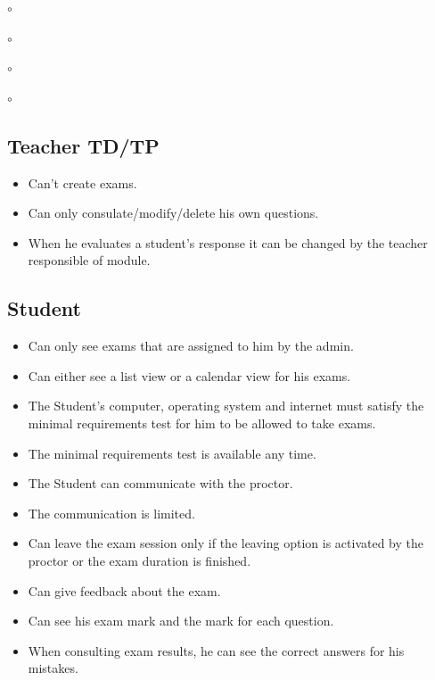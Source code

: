 \documentclass[]{uc2pfecaneva}
\begin{document}
\begin{list}{$\circ$}{}
\begin{list}{$\circ$}{}
\begin{list}{$\circ$}{}
\begin{list}{$\circ$}{}
    \raggedright\subsection{Teacher TD/TP}
    \begin{itemize}
        \item Can’t create exams.
        \item Can only consulate/modify/delete his own questions.
        \item When he evaluates a student’s response it can be changed by the teacher responsible of module.
    \end{itemize}

    \raggedright\subsection{Student}
    \begin{itemize}
        \item Can only see exams that are assigned to him by the admin.
        \item Can either see a list view or a calendar view for his exams.
        \item The Student’s computer, operating system and internet  must satisfy the minimal requirements test for him to be allowed to take exams.
        \item The  minimal requirements test is available any time.
        \item The Student can communicate with the proctor.
        \item The communication is limited.
        \item Can leave the exam session only if the leaving option is activated by the proctor or the exam duration is finished.
        \item Can give feedback about the exam.
        \item Can see his exam mark and the mark for each question.
        \item When consulting exam results, he can see the correct answers for his mistakes.
    \end{itemize}


\end{list}
\end{list}
\end{list}
\end{list}
\end{document}
